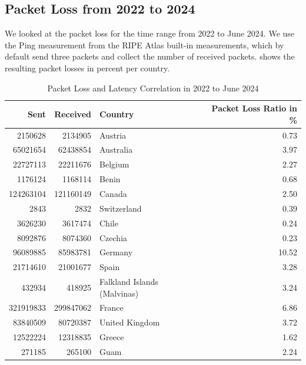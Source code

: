 \subsection{Packet Loss from 2022 to 2024} \label{sec:packet-loss}

We looked at the packet loss for the time range from 2022 to June 2024. We use
the Ping measurement from the RIPE Atlas built-in measurements, which by
default send three packets and collect the number of received packets.
 shows the resulting packet losses in percent per
country.

\begin{table}
	\footnotesize
	\caption{Packet Loss and Latency Correlation in 2022 to June 2024}
	\label{fig:packetloss-total}
	\begin{tabular}{rrlr}
		\toprule
		Sent      & Received  & Country                     & Packet
		Loss Ratio in \%                                             \\
		\midrule
		2150628   & 2134905   & Austria                     & 0.73   \\
		65021654  & 62438854  & Australia                   & 3.97   \\
		22727113  & 22211676  & Belgium                     & 2.27   \\
		1176124   & 1168114   & Benin                       & 0.68   \\
		124263104 & 121160149 & Canada                      & 2.50   \\
		2843      & 2832      & Switzerland                 & 0.39   \\
		3626230   & 3617474   & Chile                       & 0.24   \\
		8092876   & 8074360   & Czechia                     & 0.23   \\
		96089885  & 85983781  & Germany                     & 10.52  \\
		21714610  & 21001677  & Spain                       & 3.28   \\
		432934    & 418925    & Falkland Islands (Malvinas) & 3.24   \\
		321919833 & 299847062 & France                      & 6.86   \\
		83840509  & 80720387  & United Kingdom              & 3.72   \\
		12522224  & 12318835  & Greece                      & 1.62   \\
		271185    & 265100    & Guam                        & 2.24   \\

\end{tabular}
\end{table}
